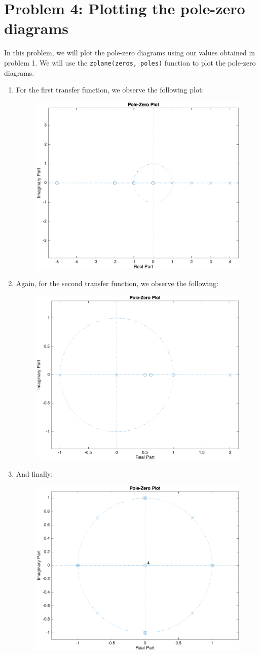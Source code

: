 \documentclass[11pt]{article}
\begin{document}
\section{Problem 4: Plotting the pole-zero diagrams}
In this problem, we will plot the pole-zero diagrams using our values obtained in problem 1.
We will use the \texttt{zplane(zeros, poles)} function to plot the pole-zero diagrams.
\begin{enumerate}[label=\textbf{\alph*)}, leftmargin=2.6em]
    \item For the first transfer function, we observe the following plot: 
    \begin{figure} [H]
        \centering
        \includegraphics[width=0.5\linewidth]{fig1.png}
    \end{figure}

    \item Again, for the second transfer function, we observe the following:
    \begin{figure} [H]
        \centering
        \includegraphics[width=0.5\linewidth]{fig2.png}
    \end{figure}

    \item And finally:
    \begin{figure} [H]
        \centering
        \includegraphics[width=0.5\linewidth]{fig3.png}
    \end{figure}
\end{enumerate}
\end{document}
